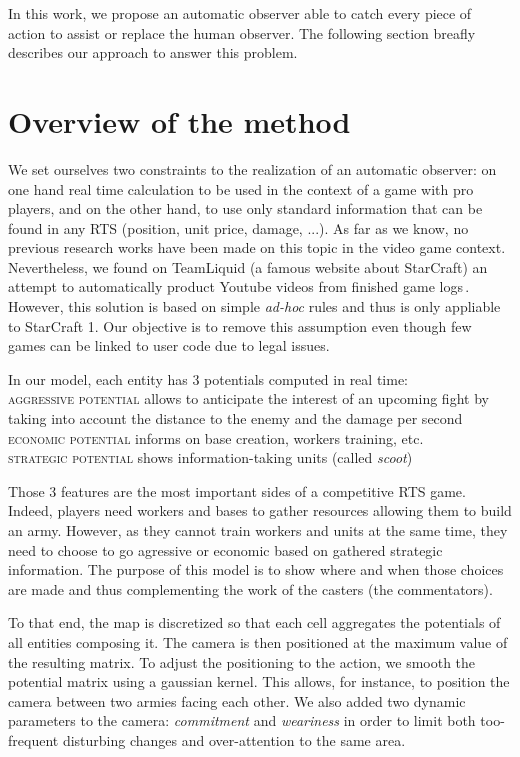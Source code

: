 \documentclass{jfsma}
\begin{document}
    In this work, we propose an automatic observer able to catch every piece of action to assist or replace the human observer. The following section breafly describes our approach to answer this problem.

\section{Overview of the method}
We set ourselves two constraints to the realization of an automatic observer: on one hand real time calculation to be used in the context of a game with pro players, and on the other hand, to use only standard information that can be found in any RTS (position, unit price, damage, ...).
As far as we know, no previous research works have been made on this topic in the video game context.
Nevertheless, we found on TeamLiquid (a famous website about StarCraft) an attempt to automatically product Youtube videos from finished game logs\,\cite{tl}.
However, this solution is based on simple \emph{ad-hoc} rules and thus is only appliable to StarCraft 1.
Our objective is to remove this assumption even though few games can be linked to user code due to legal issues.

In our model, each entity has 3 potentials computed in real time:\\
\textsc{aggressive potential} allows to anticipate the interest of an upcoming fight by taking into account the distance to the enemy and the damage per second\\
\textsc{economic potential} informs on base creation, workers training, etc.\\
\textsc{strategic potential} shows information-taking units (called \emph{scoot})

Those 3 features are the most important sides of a competitive RTS game.
Indeed, players need workers and bases to gather resources allowing them to build an army.
However, as they cannot train workers and units at the same time, they need to choose to go agressive or economic based on gathered strategic information.
The purpose of this model is to show where and when those choices are made and thus complementing the work of the casters (the commentators).

To that end, the map is discretized so that each cell aggregates the potentials of all entities composing it.
The camera is then positioned at the maximum value of the resulting matrix.
To adjust the positioning to the action, we smooth the potential matrix using a gaussian kernel.
This allows, for instance, to position the camera between two armies facing each other.
We also added two dynamic parameters to the camera: \emph{commitment} and \emph{weariness} in order to limit both too-frequent disturbing changes and over-attention to the same area.
\end{document}
